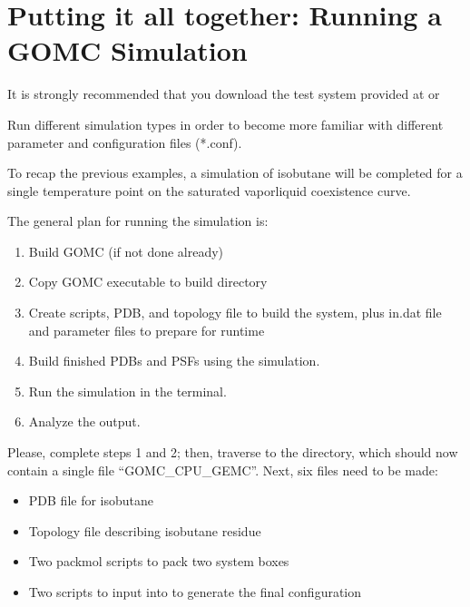 \documentclass[letterpaper,10pt,english]{sphinxmanual}
\begin{document}
\chapter{Putting it all together: Running a GOMC Simulation}
\label{\detokenize{putting_all_together:putting-it-all-together-running-a-gomc-simulation}}\label{\detokenize{putting_all_together::doc}}
\sphinxAtStartPar
It is strongly recommended that you download the test system provided at  or 

\sphinxAtStartPar
Run different simulation types in order to become more familiar with different parameter and configuration files (*.conf).

\sphinxAtStartPar
To recap the previous examples, a simulation of isobutane will be completed for a single temperature point on the saturated vapor\sphinxhyphen{}liquid coexistence curve.

\sphinxAtStartPar
The general plan for running the simulation is:
\begin{enumerate}
%
\item {} 
\sphinxAtStartPar
Build GOMC (if not done already)

\item {} 
\sphinxAtStartPar
Copy GOMC executable to build directory

\item {} 
\sphinxAtStartPar
Create scripts, PDB, and topology file to build the system, plus in.dat file and parameter files to prepare for runtime

\item {} 
\sphinxAtStartPar
Build finished PDBs and PSFs using the simulation.

\item {} 
\sphinxAtStartPar
Run the simulation in the terminal.

\item {} 
\sphinxAtStartPar
Analyze the output.

\end{enumerate}

\sphinxAtStartPar
Please, complete steps 1 and 2; then, traverse to the directory, which should now contain a single file “GOMC\_CPU\_GEMC”. Next, six files need to be made:
\begin{itemize}
\item {} 
\sphinxAtStartPar
PDB file for isobutane

\item {} 
\sphinxAtStartPar
Topology file describing isobutane residue

\item {} 
\sphinxAtStartPar
Two  packmol scripts to pack two system boxes

\item {} 
\sphinxAtStartPar
Two  scripts to input into  to generate the final configuration

\end{itemize}
\end{document}
